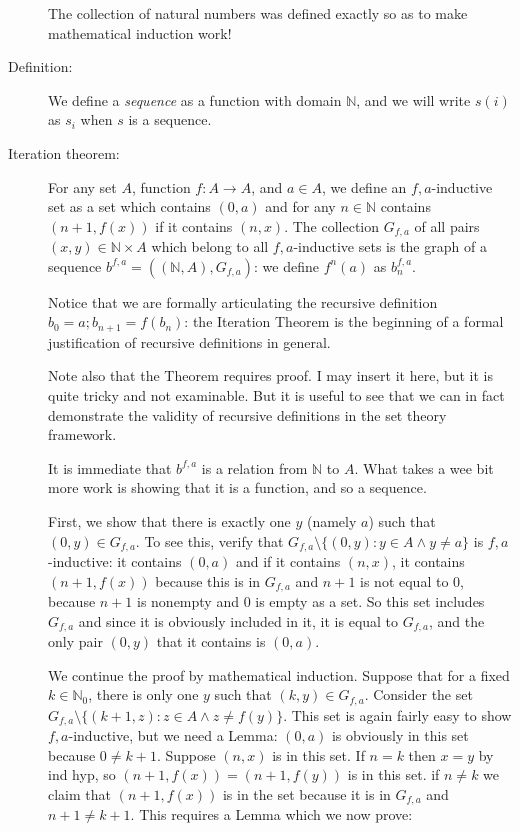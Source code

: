 \documentclass[12pt]{article}
\begin{document}
\begin{description}
The collection of natural numbers was defined exactly so as to make mathematical induction work!


\item[Definition:]  We define a {\em sequence\/} as a function with domain $\mathbb N$, and we will write $s(i)$ as $s_i$ when $s$ is a sequence.

\item[Iteration theorem:]  For any set $A$, function $f:A \rightarrow A$, and $a \in A$, we define an $f,a$-inductive set as a set which contains $(0,a)$ and for any $n \in \mathbb N$ contains $(n+1,f(x))$ if it contains $(n,x)$.  The collection $G_{f,a}$ of all pairs $(x,y)\in \mathbb N \times A$ which belong to all $f,a$-inductive sets is the graph of a sequence $b^{f,a} = ((\mathbb N,A),G_{f,a})$:  we define $f^n(a)$ as $b^{f,a}_n$.

Notice that we are formally articulating the recursive definition $b_0=a; b_{n+1}=f(b_n)$:  the Iteration Theorem is the beginning of a formal justification of recursive definitions in general.

Note also that the Theorem requires proof.  I may insert it here, but it is quite tricky and not examinable.  But it is useful to see that we can in fact demonstrate the validity of recursive definitions in the set theory framework.

It is immediate that $b^{f,a}$ is a relation from $\mathbb N$ to $A$.  What takes a wee bit more work is showing that it is a function, and so a sequence.

First, we show that there is exactly one $y$ (namely $a$) such that $(0,y) \in G_{f,a}$.  To see this, verify that
$G_{f,a} \setminus \{(0,y):y \in A \wedge y \neq a\}$ is $f,a$-inductive:  it contains $(0,a)$ and if it contains $(n,x)$, it contains $(n+1,f(x))$ because this is in $G_{f,a}$ and $n+1$ is not equal to 0, because $n+1$ is nonempty and 0 is empty as a set.  So this set includes $G_{f,a}$ and since it is obviously included in it, it is equal to $G_{f,a}$, and the only pair $(0,y)$ that it contains is $(0,a)$.

We continue the proof by mathematical induction.  Suppose that for a fixed $k \in \mathbb N_0$, there is only one $y$ such
that $(k,y) \in G_{f,a}$.  Consider the set $G_{f,a} \setminus \{(k+1,z):z \in A \wedge z \neq f(y)\}$.  This set is again fairly easy to show $f,a$-inductive, but we need a Lemma:  $(0,a)$ is obviously in this set because $0 \neq k+1$.  Suppose $(n,x)$ is in this set.
If $n=k$ then $x=y$ by ind hyp, so $(n+1,f(x)) = (n+1,f(y))$ is in this set.  if $n \neq k$ we claim that $(n+1,f(x))$ is in the set because it is in $G_{f,a}$ and $n+1 \neq k+1$.  This requires a Lemma which we now prove:


\end{description}
\end{document}
